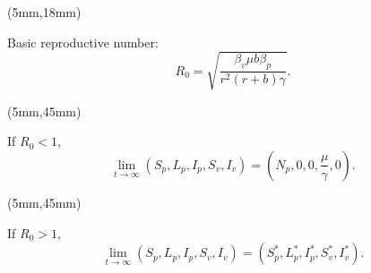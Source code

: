 	\begin{frame}[plain]
	
			\begin{textblock*}{55mm}(5mm,18mm)	
				\only<1,2,3>
				{
				\begin{greenbox}{Basic reproductive number:}
					\begin{equation*}
					R_0=\sqrt{\frac{\beta_v\mu b\beta_p}{r^2(r+b)\gamma}}.
					\end{equation*}
				\end{greenbox}
				}
			{	
				\begin{textblock*}{70mm}(5mm,45mm)
					\begin{yellowbox}{}
					
						If $R_0<1,$
						\begin{equation*}
						\lim\limits_{t\rightarrow \infty}(S_p,L_p,I_p,S_v,I_v)=(N_p,0,0,\frac{\mu}{\gamma},0).
						\end{equation*}
					\end{yellowbox}
				\end{textblock*}
			}
				{
				\begin{textblock*}{70mm}(5mm,45mm)
					\begin{yellowbox}{}
					If $R_0>1,$
						\begin{equation*}
							\lim\limits_{t\rightarrow \infty}(S_p,L_p,I_p,S_v,I_v)=(S_p^*,L_p^*,I_p^*,S_v^*,I_v^*).
						\end{equation*}
				
					\end{yellowbox}
				\end{textblock*}
				}
			

\end{textblock*}
\end{frame}
